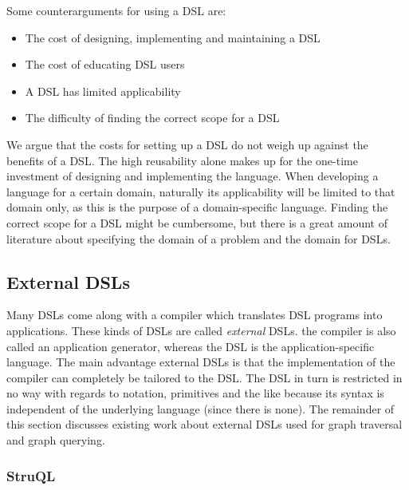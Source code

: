 \noindent Some counterarguments for using a DSL are:
\begin{itemize}
\item The cost of designing, implementing and maintaining a DSL
\item The cost of educating DSL users
\item A DSL has limited applicability
\item The difficulty of finding the correct scope for a DSL
\end{itemize}

We argue that the costs for setting up a DSL do not weigh up against the benefits of a DSL. The high reusability alone makes up for the one-time investment of designing and implementing the language. When developing a language for a certain domain, naturally its applicability will be limited to that domain only, as this is the purpose of a domain-specific language. Finding the correct scope for a DSL might be cumbersome, but there is a great amount of literature about specifying the domain of a problem\cite{Simos:1995} and the domain for DSLs\cite{karsai2014design}\cite{gunther2010agile}. 

\subsection{External DSLs}

Many DSLs come along with a compiler which translates DSL programs into applications. These kinds of DSLs are called \textit{external} DSLs. the compiler is also called an application generator\cite{Cleaveland:1988}, whereas the DSL is the application-specific language. The main advantage external DSLs is that the implementation of the compiler can completely be tailored to the DSL. The DSL in turn is restricted in no way with regards to notation, primitives and the like because its syntax is independent of the underlying language (since there is none). The remainder of this section discusses existing work about external DSLs used for graph traversal and graph querying.

\subsubsection*{StruQL}

